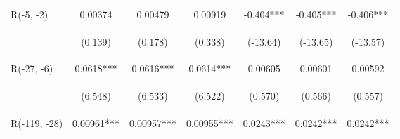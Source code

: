 \documentclass{standalone}
\begin{document}
\begin{tabular}{lcccccc}
    R(-5, -2)        & 0.00374                                         & 0.00479                                         & 0.00919                                         & -0.404***                                      & -0.405***                                      & -0.406***                                      \\
    \vspace{4pt}     & \begin{footnotesize}(0.139)\end{footnotesize}   & \begin{footnotesize}(0.178)\end{footnotesize}   & \begin{footnotesize}(0.338)\end{footnotesize}   & \begin{footnotesize}(-13.64)\end{footnotesize} & \begin{footnotesize}(-13.65)\end{footnotesize} & \begin{footnotesize}(-13.57)\end{footnotesize} \\
    R(-27, -6)       & 0.0618***                                       & 0.0616***                                       & 0.0614***                                       & 0.00605                                        & 0.00601                                        & 0.00592                                        \\
    \vspace{4pt}     & \begin{footnotesize}(6.548)\end{footnotesize}   & \begin{footnotesize}(6.533)\end{footnotesize}   & \begin{footnotesize}(6.522)\end{footnotesize}   & \begin{footnotesize}(0.570)\end{footnotesize}  & \begin{footnotesize}(0.566)\end{footnotesize}  & \begin{footnotesize}(0.557)\end{footnotesize}  \\
    R(-119, -28)     & 0.00961***                                      & 0.00957***                                      & 0.00955***                                      & 0.0243***                                      & 0.0242***                                      & 0.0242***                                      \\

\end{tabular}
\end{document}
